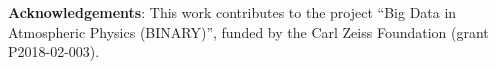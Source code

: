 \documentclass[conference]{IEEEtran}
\begin{document}
\textbf{Acknowledgements}:
This work contributes to the project  “Big Data in Atmospheric Physics (BINARY)”, funded by the Carl Zeiss Foundation (grant P2018-02-003).






%
%
%
%
%
%
\end{document}

